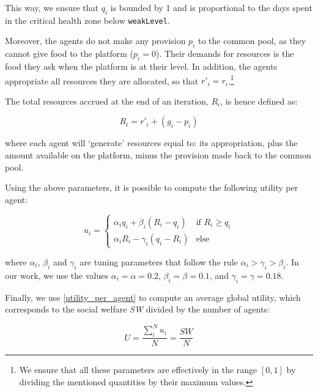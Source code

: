 This way, we ensure that $q_i$ is bounded by 1 and is proportional to the days spent in the critical health zone below \texttt{weakLevel}.

Moreover, the agents do not make any provision $p_i$ to the common pool, as they cannot give food to the platform ($p_i=0$). Their demands for resources is the food they ask when the platform is at their level. In addition, the agents appropriate all resources they are allocated, so that $r'_i=r_i$.\footnote{We ensure that all these parameters are effectively in the range $[0,1]$ by dividing the mentioned quantities by their maximum values.}

The total resources accrued at the end of an iteration, $R_i$, is hence defined as:

\begin{equation}\label{resources_accrued}
    R_i=r'_i+ (g_i-p_i)
\end{equation}

where each agent will `generate' resources equal to: its appropriation, plus the amount available on the platform, minus the provision made back to the common pool.

Using the above parameters, it is possible to compute the following utility per agent:

\begin{equation}\label{utility_per_agent}
    u_i=\begin{cases}
     \alpha_iq_i + \beta_i(R_i-q_i) & \mbox{if } R_i\geq q_i  \\ 
     \alpha_i R_i - \gamma_i(q_i-R_i) & \mbox{else}
     \end{cases}
\end{equation}


where $\alpha_i$, $\beta_i$ and $\gamma_i$ are tuning parameters that follow the rule $\alpha_i>\gamma_i>\beta_i$. In our work, we use the values $\alpha_i=\alpha=0.2$, $\beta_i=\beta=0.1$, and $\gamma_i=\gamma=0.18$.

Finally, we use \eqref{utility_per_agent} to compute an average global utility, which corresponds to the social welfare \textit{SW} divided by the number of agents:

\begin{equation}\label{utility_eq}
    \mathit{U}=\frac{\sum_i^N u_i}{N}=\frac{\mathit{SW}}{N}
\end{equation}